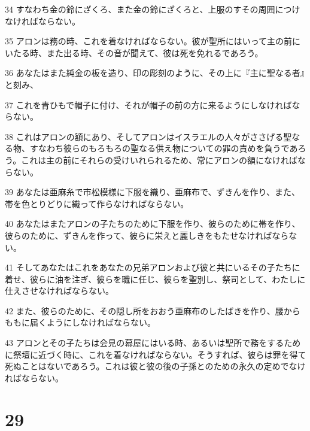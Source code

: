 \par 34 すなわち金の鈴にざくろ、また金の鈴にざくろと、上服のすその周囲につけなければならない。
\par 35 アロンは務の時、これを着なければならない。彼が聖所にはいって主の前にいたる時、また出る時、その音が聞えて、彼は死を免れるであろう。
\par 36 あなたはまた純金の板を造り、印の彫刻のように、その上に『主に聖なる者』と刻み、
\par 37 これを青ひもで帽子に付け、それが帽子の前の方に来るようにしなければならない。
\par 38 これはアロンの額にあり、そしてアロンはイスラエルの人々がささげる聖なる物、すなわち彼らのもろもろの聖なる供え物についての罪の責めを負うであろう。これは主の前にそれらの受けいれられるため、常にアロンの額になければならない。
\par 39 あなたは亜麻糸で市松模様に下服を織り、亜麻布で、ずきんを作り、また、帯を色とりどりに織って作らなければならない。
\par 40 あなたはまたアロンの子たちのために下服を作り、彼らのために帯を作り、彼らのために、ずきんを作って、彼らに栄えと麗しきをもたせなければならない。
\par 41 そしてあなたはこれをあなたの兄弟アロンおよび彼と共にいるその子たちに着せ、彼らに油を注ぎ、彼らを職に任じ、彼らを聖別し、祭司として、わたしに仕えさせなければならない。
\par 42 また、彼らのために、その隠し所をおおう亜麻布のしたばきを作り、腰からももに届くようにしなければならない。
\par 43 アロンとその子たちは会見の幕屋にはいる時、あるいは聖所で務をするために祭壇に近づく時に、これを着なければならない。そうすれば、彼らは罪を得て死ぬことはないであろう。これは彼と彼の後の子孫とのための永久の定めでなければならない。

\chapter{29}

